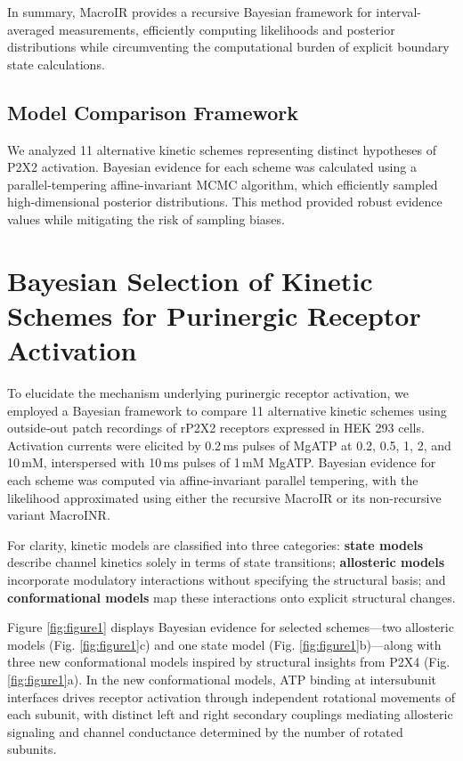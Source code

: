 \documentclass[pdflatex,sn-mathphys-num]{sn-jnl}%
\theoremstyle{thmstyleone}%
\theoremstyle{thmstyletwo}%
\theoremstyle{thmstylethree}%
\begin{document}
In summary, MacroIR provides a recursive Bayesian framework for interval-averaged measurements, efficiently computing likelihoods and posterior distributions while circumventing the computational burden of explicit boundary state calculations.
\subsection{Model Comparison Framework}
We analyzed 11 alternative kinetic schemes representing distinct hypotheses of P2X2 activation. Bayesian evidence for each scheme was calculated using a parallel-tempering affine-invariant MCMC algorithm, which efficiently sampled high-dimensional posterior distributions. This method provided robust evidence values while mitigating the risk of sampling biases. 


\section{Bayesian Selection of Kinetic Schemes for Purinergic Receptor Activation}

To elucidate the mechanism underlying purinergic receptor activation, we employed a Bayesian framework to compare 11 alternative kinetic schemes using outside‐out patch recordings of rP2X2 receptors expressed in HEK 293 cells. Activation currents were elicited by 0.2\,ms pulses of MgATP at 0.2, 0.5, 1, 2, and 10\,mM, interspersed with 10\,ms pulses of 1\,mM MgATP. Bayesian evidence for each scheme was computed via affine-invariant parallel tempering, with the likelihood approximated using either the recursive MacroIR or its non-recursive variant MacroINR.

For clarity, kinetic models are classified into three categories: \textbf{state models} describe channel kinetics solely in terms of state transitions; \textbf{allosteric models} incorporate modulatory interactions without specifying the structural basis; and \textbf{conformational models} map these interactions onto explicit structural changes.

Figure \ref{fig:figure1} displays Bayesian evidence for selected schemes—two allosteric models (Fig. \ref{fig:figure1}c) and one state model (Fig. \ref{fig:figure1}b)—along with three new conformational models inspired by structural insights from P2X4 (Fig. \ref{fig:figure1}a). In the new conformational models, ATP binding at intersubunit interfaces drives receptor activation through independent rotational movements of each subunit, with distinct left and right secondary couplings mediating allosteric signaling and channel conductance determined by the number of rotated subunits.
\end{document}
